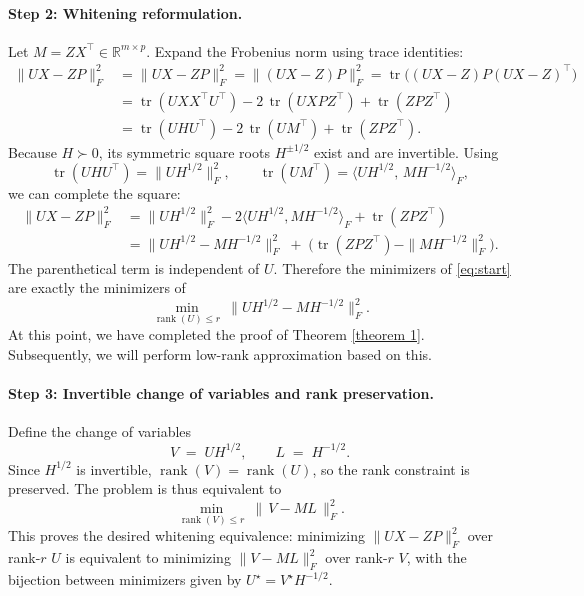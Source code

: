 \paragraph{Step 2: Whitening reformulation.}
Let $M=ZX^\top\in\mathbb{R}^{m\times p}$. Expand the Frobenius norm using trace identities:
\begin{align}
\|UX - ZP\|_F^2
&= \|UX - ZP\|_F^2
= \|(UX - Z)P\|_F^2
= \operatorname{tr}\!\big((UX - Z)P(UX - Z)^\top\big) \nonumber\\
&= \operatorname{tr}(UXX^\top U^\top) - 2\,\operatorname{tr}(UXPZ^\top) + \operatorname{tr}(ZPZ^\top) \nonumber\\
&= \operatorname{tr}(UHU^\top) - 2\,\operatorname{tr}(UM^\top) + \operatorname{tr}(ZPZ^\top).
\label{eq:expand}
\end{align}
Because $H\succ0$, its symmetric square roots $H^{\pm 1/2}$ exist and are invertible. Using
\begin{equation}
\operatorname{tr}(UHU^\top)=\|UH^{1/2}\|_F^2,
\qquad
\operatorname{tr}(UM^\top)=\langle UH^{1/2},\, MH^{-1/2}\rangle_F,
\end{equation}
we can complete the square:
\begin{align}
\|UX - ZP\|_F^2
&= \|UH^{1/2}\|_F^2 - 2\langle UH^{1/2}, MH^{-1/2}\rangle_F + \operatorname{tr}(ZPZ^\top) \nonumber\\
&= \|UH^{1/2} - MH^{-1/2}\|_F^2 
\;+\; \Big(\operatorname{tr}(ZPZ^\top) - \|MH^{-1/2}\|_F^2\Big).
\label{eq:completed-square}
\end{align}
The parenthetical term is independent of $U$. Therefore the minimizers of \eqref{eq:start} are exactly the minimizers of
\begin{equation}
\min_{\operatorname{rank}(U)\le r}\ \big\|UH^{1/2} - MH^{-1/2}\big\|_F^2 .
\end{equation}
At this point, we have completed the proof of Theorem \ref{theorem 1}. Subsequently, we will perform low-rank approximation based on this.

\paragraph{Step 3: Invertible change of variables and rank preservation.}
Define the change of variables
\begin{equation}
V \;=\; U H^{1/2}, 
\qquad
L \;=\; H^{-1/2}.
\end{equation}
Since $H^{1/2}$ is invertible, $\operatorname{rank}(V)=\operatorname{rank}(U)$, so the rank constraint is preserved. The problem is thus equivalent to
\begin{equation}
\min_{\operatorname{rank}(V)\le r}\ \|\,V - ML\,\|_F^2 .
\end{equation}
This proves the desired whitening equivalence: minimizing $\|UX - ZP\|_F^2$ over rank-$r$ $U$ is equivalent to minimizing $\|V - ML\|_F^2$ over rank-$r$ $V$, with the bijection between minimizers given by $U^\star = V^\star H^{-1/2}$.



